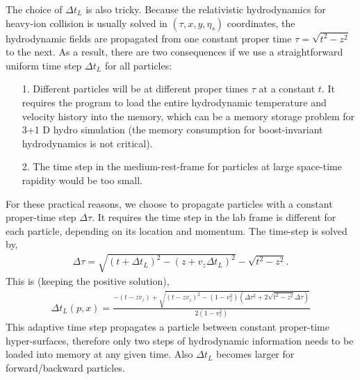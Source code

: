 The choice of $\Delta t_L$ is also tricky. 
Because the relativistic hydrodynamics for heavy-ion collision is usually solved in $(\tau,x,y,\eta_s)$ coordinates, the hydrodynamic fields are propagated from one constant proper time $\tau = \sqrt{t^2 - z^2}$ to the next.
As a result, there are two consequences if we use a straightforward uniform time step  $\Delta t_L$ for all particles:
\begin{itemize}
\item[1.] Different particles will be at different proper times $\tau$ at a constant $t$. It requires the program to load the entire hydrodynamic temperature and velocity history into the memory, which can be a memory storage problem for 3+1 D hydro simulation (the memory consumption for boost-invariant hydrodynamics is not critical).
\item[2.] The time step in the medium-rest-frame for particles at large space-time rapidity would be too small.
\end{itemize}
For these practical reasons, we choose to propagate particles with a constant proper-time step $\Delta \tau$. 
It requires the time step in the lab frame is different for each particle, depending on its location and momentum. The time-step is solved by,
\begin{eqnarray}
\Delta \tau = \sqrt{(t+\Delta t_L)^2 - (z+v_z \Delta t_L)^2} - \sqrt{t^2 - z^2}.
\end{eqnarray}
This is (keeping the positive solution),
\begin{eqnarray}
\Delta t_L(p, x) = \frac{-(t-z v_z) + \sqrt{(t-z v_z)^2 - (1-v_z^2)(\Delta \tau^2 + 2\sqrt{t^2 - z^2}\Delta \tau )}}{2(1-v_z^2)}
\label{eq:dt-transformation}
\end{eqnarray}
This adaptive time step propagates a particle between constant proper-time hyper-surfaces, therefore only two steps of hydrodynamic information needs to be loaded into memory at any given time.
Also $\Delta t_L$ becomes larger for forward/backward particles.

